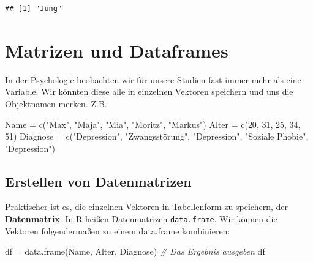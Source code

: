 \documentclass[
]{book}
\newenvironment{Shaded}{\begin{snugshade}}{\end{snugshade}}
\newcommand{\CommentTok}[1]{\textcolor[rgb]{0.56,0.35,0.01}{\textit{#1}}}
\newcommand{\DecValTok}[1]{\textcolor[rgb]{0.00,0.00,0.81}{#1}}
\newcommand{\FunctionTok}[1]{\textcolor[rgb]{0.00,0.00,0.00}{#1}}
\newcommand{\NormalTok}[1]{#1}
\newcommand{\OtherTok}[1]{\textcolor[rgb]{0.56,0.35,0.01}{#1}}
\newcommand{\StringTok}[1]{\textcolor[rgb]{0.31,0.60,0.02}{#1}}
\begin{document}
\begin{verbatim}
## [1] "Jung"
\end{verbatim}

\hypertarget{matrizen-und-dataframes}{%
\section{Matrizen und Dataframes}\label{matrizen-und-dataframes}}

In der Psychologie beobachten wir für unsere Studien fast immer mehr als eine Variable. Wir könnten diese alle in einzelnen Vektoren speichern und uns die Objektnamen merken. Z.B.

\begin{Shaded}
\begin{Highlighting}[]
\NormalTok{Name }\OtherTok{=} \FunctionTok{c}\NormalTok{(}\StringTok{"Max"}\NormalTok{, }\StringTok{"Maja"}\NormalTok{, }\StringTok{"Mia"}\NormalTok{, }\StringTok{"Moritz"}\NormalTok{, }\StringTok{"Markus"}\NormalTok{)}
\NormalTok{Alter }\OtherTok{=} \FunctionTok{c}\NormalTok{(}\DecValTok{20}\NormalTok{, }\DecValTok{31}\NormalTok{, }\DecValTok{25}\NormalTok{, }\DecValTok{34}\NormalTok{, }\DecValTok{51}\NormalTok{)}
\NormalTok{Diagnose }\OtherTok{=} \FunctionTok{c}\NormalTok{(}\StringTok{"Depression"}\NormalTok{, }\StringTok{"Zwangsstörung"}\NormalTok{, }\StringTok{"Depression"}\NormalTok{, }\StringTok{"Soziale Phobie"}\NormalTok{, }\StringTok{"Depression"}\NormalTok{)}
\end{Highlighting}
\end{Shaded}

\hypertarget{erstellen-von-datenmatrizen}{%
\subsection{Erstellen von Datenmatrizen}\label{erstellen-von-datenmatrizen}}

Praktischer ist es, die einzelnen Vektoren in Tabellenform zu speichern, der \textbf{Datenmatrix}. In R heißen Datenmatrizen \texttt{data.frame}. Wir können die Vektoren folgendermaßen zu einem data.frame kombinieren:

\begin{Shaded}
\begin{Highlighting}[]
\NormalTok{df }\OtherTok{=} \FunctionTok{data.frame}\NormalTok{(Name, Alter, Diagnose)}
\CommentTok{\# Das Ergebnis ausgeben}
\NormalTok{df}
\end{Highlighting}
\end{Shaded}
\end{document}
